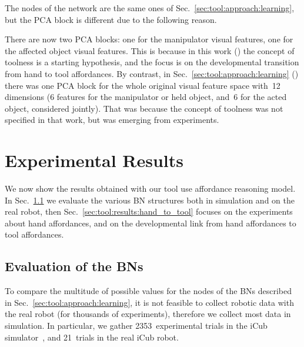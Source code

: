 The nodes of the network are the same ones of Sec.~\ref{sec:tool:approach:learning},
but the \ac{PCA} block is different due to the following reason.

There are now two \ac{PCA} blocks: one for the manipulator visual features, one for the affected object visual features.
This is because in this work (\cite{saponaro:2017:icdl}) the concept of toolness is a starting hypothesis, and the focus is on the developmental transition from hand to tool affordances.
By contrast, in Sec.~\ref{sec:tool:approach:learning} (\cite{goncalves:2014:icdl}) there was one \ac{PCA} block for the whole original visual feature space with~12 dimensions (6 features for the manipulator or held object, and~6 for the acted object, considered jointly).
That was because the concept of toolness was not specified in that work, but was emerging from experiments.

\section{Experimental Results}
\label{sec:tool:results}

We now show the results obtained with our tool use affordance reasoning model.
In Sec.~\ref{sec:tool:results:bns} we evaluate the various \intobj{} \ac{BN} structures both in simulation and on the real robot, then
Sec.~\ref{sec:tool:results:hand_to_tool} focuses on the experiments about hand affordances, and on the developmental link from hand affordances to tool affordances.

\subsection{Evaluation of the \IntObj{} \aclp{BN}}
\label{sec:tool:results:bns}

To compare the multitude of possible values for the nodes of the \acp{BN} described in Sec.~\ref{sec:tool:approach:learning}, it is not feasible to collect robotic data with the real robot (for thousands of experiments), therefore we collect most data in simulation.
In particular, we gather \num{2353}~experimental trials in the iCub simulator~\cite{tikhanoff:2008:icubsim}, and 21~trials in the real iCub robot.

